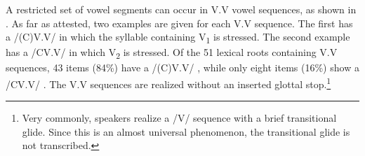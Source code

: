 A restricted set of vowel segments can occur in V.V vowel sequences, as shown in . As far as attested, two examples are given for each V.V sequence. The first has a /(C)V.V/  in which the syllable containing V\textsubscript{1} is stressed. The second example has a /CV.V/  in which V\textsubscript{2} is stressed. Of the 51 lexical roots containing V.V sequences, 43 items (84\%) have a /(C)V.V/ , while only eight items (16\%) show a /CV.V/ . The V.V sequences are realized without an inserted glottal stop.\footnote{Very commonly, speakers realize a /V/ sequence with a brief transitional glide. Since this is an almost universal phenomenon, the transitional glide is not transcribed.}

